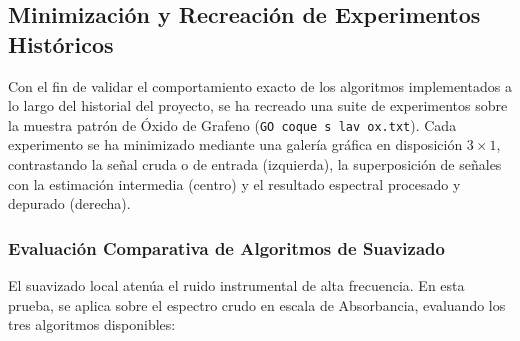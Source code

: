 \subsection{Minimización y Recreación de Experimentos Históricos}
Con el fin de validar el comportamiento exacto de los algoritmos implementados a lo largo del historial del proyecto, se ha recreado una suite de experimentos sobre la muestra patrón de Óxido de Grafeno (\texttt{GO coque s lav ox.txt}). Cada experimento se ha minimizado mediante una galería gráfica en disposición $3 \times 1$, contrastando la señal cruda o de entrada (izquierda), la superposición de señales con la estimación intermedia (centro) y el resultado espectral procesado y depurado (derecha).

\subsubsection{Evaluación Comparativa de Algoritmos de Suavizado}
El suavizado local atenúa el ruido instrumental de alta frecuencia. En esta prueba, se aplica sobre el espectro crudo en escala de Absorbancia, evaluando los tres algoritmos disponibles:

